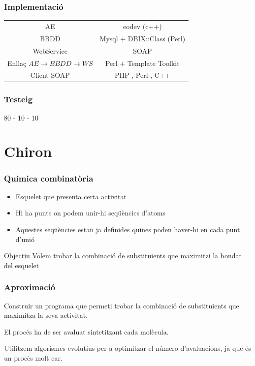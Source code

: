 \documentclass{beamer}
\begin{document}
\begin{frame}
\frametitle{Implementació}
\begin{tabular}[h!]{|c|c|}
	AE                                         & eodev (c++)                \\ 
	BBDD                                       & Mysql + DBIX::Class (Perl) \\ 
	WebService                                 & SOAP                       \\ 
	Enllaç $AE\rightarrow BBDD\rightarrow WS$  & Perl + Template Toolkit    \\ 
	Client SOAP                                & PHP , Perl , C++           \\ 
\end{tabular}
\end{frame}

\begin{frame}
	\frametitle{Testeig}
	80 - 10 - 10
\end{frame}


\section{Chiron} %
\label{sec:Chiron}
\begin{frame}
	\frametitle{Química combinatòria}
	\begin{itemize}
		\item Esquelet que presenta certa activitat
		\item Hi ha punts on podem unir-hi seqüències d'atoms
		\item Aquestes seqüències estan ja definides quines poden haver-hi en cada punt d'unió
	\end{itemize}
	\pause
	\begin{block}{Objectiu}
		Volem trobar la combinació de substituients que maximitzi la bondat del esquelet
	\end{block}
\end{frame}

\begin{frame}
	\frametitle{Aproximació}
	Construir un programa que permeti trobar la combinació de substituients que
	maximitza la seva activitat.

	El procés ha de ser avaluat sintetitzant cada molècula.

	Utilitzem algorismes evolutius per a optimitzar el número d'avaluacions, ja
	que és un procés molt car.
\end{frame}
\end{document}
